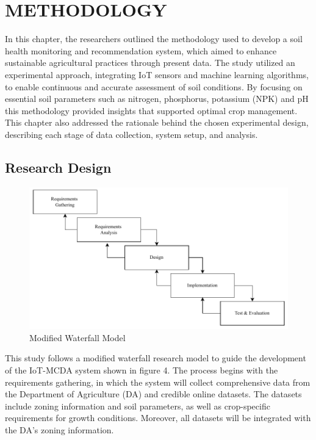 \chapter{METHODOLOGY}
{\baselineskip
	
	In this chapter, the researchers outlined the methodology used to develop a soil health monitoring and recommendation system, which aimed to enhance sustainable agricultural practices through present data. The study utilized an experimental approach, integrating IoT sensors and machine learning algorithms, to enable continuous and accurate assessment of soil conditions. By focusing on essential soil parameters such as nitrogen, phosphorus, potassium (NPK) and pH this methodology provided insights that supported optimal crop management. This chapter also addressed the rationale behind the chosen experimental design, describing each stage of data collection, system setup, and analysis.
		
	\section{Research Design}
	\begin{figure}[H]
		\centering
		\caption{Modified Waterfall Model}
		\label{fig:ResearchDesign}
		\includegraphics[width=1\textwidth]{figures/ResearchDesign.pdf}
	\end{figure}
	
	This study follows a modified waterfall research model to guide the development of the IoT-MCDA system shown in figure 4. The process begins with the requirements gathering, in which the system will collect comprehensive data from the Department of Agriculture (DA) and credible online datasets. The datasets include zoning information and soil parameters, as well as crop-specific requirements for growth conditions. Moreover, all datasets will be integrated with the DA’s zoning information.
	 
}
